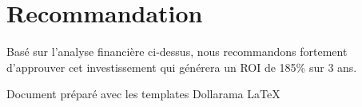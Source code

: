 \section{Recommandation}


Basé sur l'analyse financière ci-dessus, nous recommandons fortement d'approuver cet investissement qui générera un ROI de 185\% sur 3 ans.

\vfill
\begin{center}
{\small Document préparé avec les templates Dollarama LaTeX}
\end{center}

